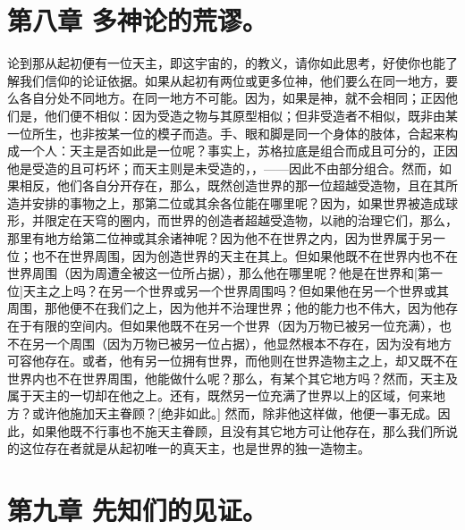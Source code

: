 
\section{第八章 多神论的荒谬。}

论到那从起初便有一位天主，即这宇宙的，的教义，请你如此思考，好使你也能了解我们信仰的论证依据。如果从起初有两位或更多位神，他们要么在同一地方，要么各自分处不同地方。在同一地方不可能。因为，如果是神，就不会相同；正因他们是，他们便不相似：因为受造之物与其原型相似；但非受造者不相似，既非由某一位所生，也非按某一位的模子而造。手、眼和脚是同一个身体的肢体，合起来构成一个人：天主是否如此是一位呢？事实上，苏格拉底是组合而成且可分的，正因他是受造的且可朽坏；而天主则是未受造的，，——因此不由部分组合。然而，如果相反，他们各自分开存在，那么，既然创造世界的那一位超越受造物，且在其所造并安排的事物之上，那第二位或其余各位能在哪里呢？因为，如果世界被造成球形，并限定在天穹的圈内，而世界的创造者超越受造物，以祂的治理它们，那么，那里有地方给第二位神或其余诸神呢？因为他不在世界之内，因为世界属于另一位；也不在世界周围，因为创造世界的天主在其上。但如果他既不在世界内也不在世界周围（因为周遭全被这一位所占据），那么他在哪里呢？他是在世界和[第一位]天主之上吗？在另一个世界或另一个世界周围吗？但如果他在另一个世界或其周围，那他便不在我们之上，因为他并不治理世界；他的能力也不伟大，因为他存在于有限的空间内。但如果他既不在另一个世界（因为万物已被另一位充满），也不在另一个周围（因为万物已被另一位占据），他显然根本不存在，因为没有地方可容他存在。或者，他有另一位拥有世界，而他则在世界造物主之上，却又既不在世界内也不在世界周围，他能做什么呢？那么，有某个其它地方吗？然而，天主及属于天主的一切却在他之上。还有，既然另一位充满了世界以上的区域，何来地方？或许他施加天主眷顾？[绝非如此。] 然而，除非他这样做，他便一事无成。因此，如果他既不行事也不施天主眷顾，且没有其它地方可让他存在，那么我们所说的这位存在者就是从起初唯一的真天主，也是世界的独一造物主。\par


\section{第九章 先知们的见证。}

